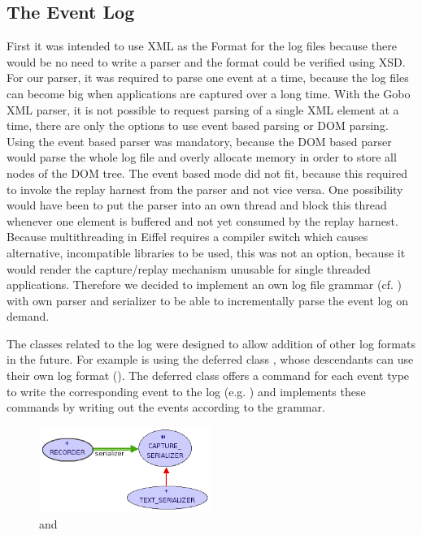 \subsection{The Event Log}
First it was intended to use XML as the Format for the log files because there would be no need to write a parser and the format could be verified using XSD. For our parser, it was required to parse one event at a time, because the log files can become big when applications are captured over a long time. With the Gobo XML parser, it is not possible to request parsing of a single XML element at a time, there are only the options to use event based parsing or DOM parsing. Using the event based parser was mandatory, because the DOM based parser would parse the whole log file and overly allocate memory in order to store all nodes of the DOM tree. The event based mode did not fit, because this required to invoke the replay harnest from the parser and not vice versa. One possibility would have been to put the parser into an own thread and block this thread whenever one element is buffered and not yet consumed by the replay harnest. Because multithreading in Eiffel requires a compiler switch which causes alternative, incompatible libraries to be used, this was not an option, because it would render the capture/replay mechanism unusable for single threaded applications.
Therefore we decided to implement an own log file grammar (cf. ) with own parser and serializer to be able to incrementally parse the event log on demand.


The classes related to the log were designed to allow addition of other log formats in the future. For example  is using the deferred class , whose descendants can use their own log format (). The deferred class offers a command for each event type to write the corresponding event to the log (e.g. ) and  implements these commands by writing out the events according to the grammar.

\begin{figure}[ht]
  \centering
  \includegraphics[width=0.5\textwidth]{illustrations/implementation_serializer.png}
  \caption{ and }
  \label{fig:implementation_serializer}
\end{figure}

